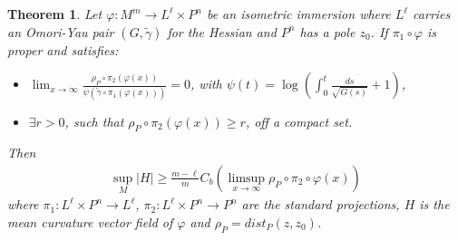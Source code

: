 \documentclass[a4paper]{amsart}
\newtheorem{theorem}{Theorem}
\begin{document}
\begin{theorem}
Let $ \varphi \colon M^{m} \to L^{\ell}\times P^{n} $ be an isometric immersion where $ L^\ell $ carries an Omori-Yau pair  $ (G,\tilde{\gamma}) $ for the Hessian and $ P^n $ has a pole  $ z_0 $. If $ \pi_1 \circ \varphi $ is proper and satisfies:
\begin{itemize}
\item[i)] $\displaystyle{\lim_{x \rightarrow \infty}\frac{\rho_{P}\circ \pi_{2}(\varphi(x))}{\psi(\tilde{\gamma}\circ \pi_{1}(\varphi(x)))}} = 0$, with $ \displaystyle{\psi(t) = \log\left(\int_{0}^{t}\frac{ds}{\sqrt{G(s)}}+1\right)}$,
\item[ii)] $ \exists r > 0 $, such that $ \rho_{P}\circ \pi_{2}(\varphi(x)) \geq r $, off a compact set.
\end{itemize}
Then
\begin{eqnarray*}
\sup_{M}\vert H\vert \geq \frac{m-\ell}{m}C_{b}(\limsup_{x\to \infty}\rho_{P}\circ \pi_{2}\circ \varphi (x))
\end{eqnarray*}
where  $ \pi_1 : L^{\ell}\times P^{n} \to L^{\ell} $, $ \pi_2 : L^{\ell}\times P^{n} \to P^{n} $ are the standard projections, $ H $ is the mean curvature vector field of $ \varphi $ and $ \rho_{P} = dist_{P}(z,z_0) $.
\end{theorem}
\end{document}
